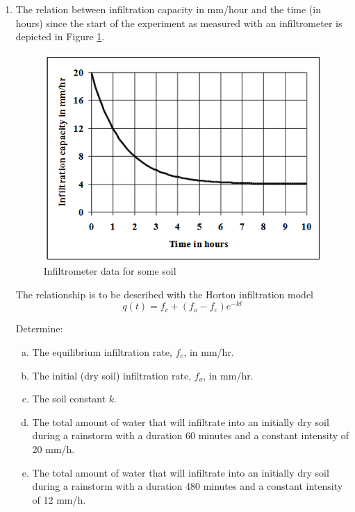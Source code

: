 \documentclass[12pt]{article}
\begin{document}
\begin{enumerate}
\clearpage
\item The relation between infiltration capacity in mm/hour and the time (in hours) since the
start of the experiment as measured with an infiltrometer is depicted in Figure \ref{fig:INFIL}. 

\begin{figure}[h!] %
   \centering
   \includegraphics[width=5in]{INFIL.png} 
   \caption{Infiltrometer data for some soil}
   \label{fig:INFIL}
\end{figure}

The relationship is to be described with the Horton infiltration model 
\begin{equation}
q(t)=f_c+(f_o-f_c)e^{-kt}
\end{equation}

Determine:
    \begin{enumerate}[a)]
        \item The equilibrium infiltration rate, $f_c$, in mm/hr.
        \item The initial (dry soil) infiltration rate, $f_o$, in mm/hr.
        \item The soil constant $k$.
        \item The total amount of water that will infiltrate into an initially dry soil during a rainstorm with a duration 60 minutes and a constant intensity of 20 mm/h.
        \item The total amount of water that will infiltrate into an initially dry soil during a rainstorm with a duration 480 minutes and a constant intensity of 12 mm/h.
    \end{enumerate}

\end{enumerate}
\end{document}
